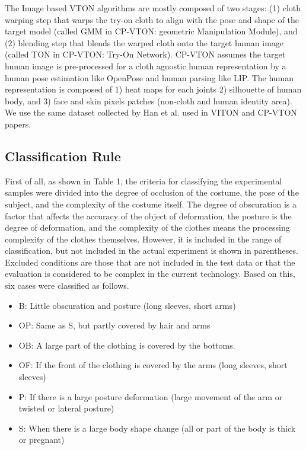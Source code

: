 \documentclass[runningheads]{llncs}
\begin{document}
The Image based VTON algorithms are mostly composed of two stages: (1) cloth warping step that warps the try-on cloth to align with the pose and shape of the target model (called GMM in CP-VTON: geometric Manipulation Module)\cite{Wang2018TowardCI}, and (2) blending step that blends the warped cloth onto the target human image (called TON in CP-VTON: Try-On Network)\cite{Wang2018TowardCI}. CP-VTON assumes the target human image is pre-processed for a cloth agnostic human representation by a human pose estimation like OpenPose\cite{Cao2018OpenPoseRM} and human parsing like LIP\cite{Liang2018LookIP}. The human representation is composed of 1) heat maps for each joints 2) silhouette of human body, and 3) face and skin pixels patches (non-cloth and human identity area). We use the same dataset collected by Han et al. used in VITON\cite{Han2017VITONAI} and CP-VTON\cite{Wang2018TowardCI} papers.
 


 
\subsection{Classification Rule}

First of all, as shown in Table 1, the criteria for classifying the experimental samples were divided into the degree of occlusion of the costume, the pose of the subject, and the complexity of the costume itself. The degree of obscuration is a factor that affects the accuracy of the object of deformation, the posture is the degree of deformation, and the complexity of the clothes means the processing complexity of the clothes themselves. However, it is included in the range of classification, but not included in the actual experiment is shown in parentheses. Excluded conditions are those that are not included in the test data or that the evaluation is considered to be complex in the current technology. Based on this, six cases were classified as follows.

\begin{itemize}

\item B: Little obscuration and posture (long sleeves, short arms)
\item OP: Same as S, but partly covered by hair and arms
\item OB: A large part of the clothing is covered by the bottoms.
\item OF: If the front of the clothing is covered by the arms (long sleeves, short sleeves)
\item P: If there is a large posture deformation (large movement of the arm or twisted or lateral posture)
\item S: When there is a large body shape change (all or part of the body is thick or pregnant)

\end{itemize}
\end{document}
